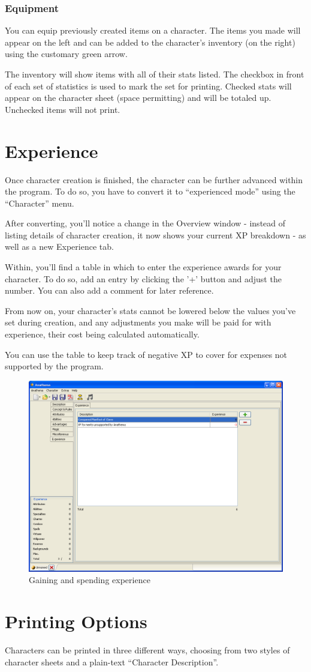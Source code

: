 \subsubsection{Equipment}
You can equip previously created items on a character. The items you made will appear on the left and can be added to the character's inventory (on the right) using the customary green arrow. 

The inventory will show items with all of their stats listed. The checkbox in front of each set of statistics is used to mark the set for printing. Checked stats will appear on the character sheet (space permitting) and will be totaled up.  Unchecked items will not print.

\section{Experience}
Once character creation is finished, the character can be further advanced within the program. To do so, you have to convert it to "`experienced mode"' using the "`Character"' menu.
 
After converting, you'll notice a change in the Overview window - instead of listing details of character creation, it now shows your current XP breakdown - as well as a new Experience tab.

Within, you'll find a table in which to enter the experience awards for your character.  To do so, add an entry by clicking the '+' button and adjust the number. You can also add a comment for later reference.

From now on, your character's stats cannot be lowered below the values you've set during creation, and any adjustments you make will be paid for with experience, their cost being calculated automatically. 

You can use the table to keep track of negative XP to cover for expenses not supported by the program.   

\begin{figure}
	\centering
		\includegraphics[width=1.00\textwidth]{images/Experience.png}
	\caption{Gaining and spending experience}
	\label{fig:Experience}
\end{figure}

\section{Printing Options}
Characters can be printed in three different ways, choosing from two styles of character sheets and a plain-text "`Character Description"'.